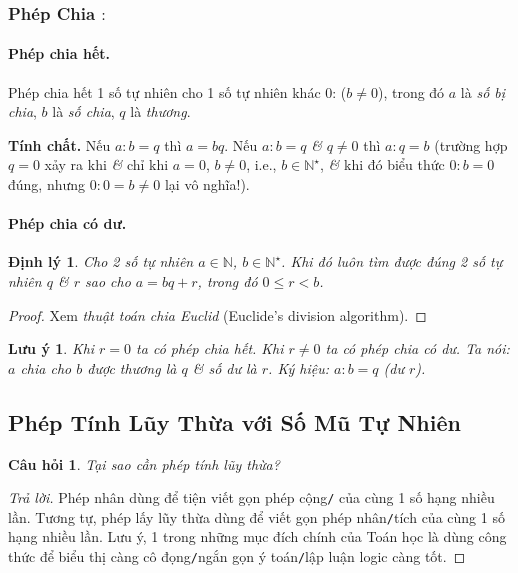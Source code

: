 \documentclass{article}
\numberwithin{equation}{section}
\newtheorem{theorem}{Định lý}[section]
\newtheorem{remark}{Lưu ý}[section]
\newtheorem{question}{Câu hỏi}[section]
\begin{document}
\subsubsection{Phép Chia $:$}

\paragraph{Phép chia hết.} Phép chia hết 1 số tự nhiên cho 1 số tự nhiên khác 0:  ($b\ne 0$), trong đó $a$ là \textit{số bị chia}, $b$ là \textit{số chia}, $q$ là \textit{thương}.

\noindent\textbf{Tính chất.} Nếu $a:b = q$ thì $a = bq$. Nếu $a:b = q$ \textit{\&} $q\ne 0$ thì $a:q = b$ (trường hợp $q = 0$ xảy ra khi \textit{\&} chỉ khi $a = 0$, $b\ne 0$, i.e., $b\in\mathbb{N}^\star$, \textit{\&} khi đó biểu thức $0:b = 0$ đúng, nhưng $0:0 = b\ne 0$ lại vô nghĩa!).

\paragraph{Phép chia có dư.}
\begin{theorem}
	Cho 2 số tự nhiên $a\in\mathbb{N}$, $b\in\mathbb{N}^\star$. Khi đó luôn tìm được đúng 2 số tự nhiên $q$ \textit{\&} $r$ sao cho $a = bq + r$, trong đó $0\le r < b$.
\end{theorem}

\begin{proof}[Proof]
	Xem \textit{thuật toán chia Euclid} (Euclide's division algorithm).
\end{proof}

\begin{remark}
	Khi $r = 0$ ta có phép chia hết. Khi $r\ne 0$ ta có phép chia có dư. Ta nói: $a$ chia cho $b$ được thương là $q$ \textit{\&} số dư là $r$. Ký hiệu: $a:b = q$ (dư $r$).
\end{remark}

\subsection{Phép Tính Lũy Thừa với Số Mũ Tự Nhiên}

\begin{question}
	Tại sao cần phép tính lũy thừa?
\end{question}

\begin{proof}[Trả lời]
	Phép nhân dùng để tiện viết gọn phép cộng\texttt{/} của cùng 1 số hạng nhiều lần. Tương tự, phép lấy lũy thừa dùng để viết gọn phép nhân\texttt{/}tích của cùng 1 số hạng nhiều lần. Lưu ý, 1 trong những mục đích chính của Toán học là dùng công thức để biểu thị càng cô đọng\texttt{/}ngắn gọn ý toán\texttt{/}lập luận logic càng tốt.
\end{proof}
\end{document}
